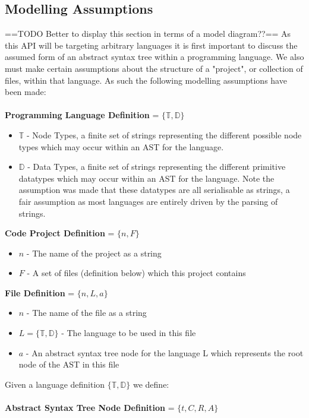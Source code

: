 \documentclass{article}
\begin{document}
\subsection{Modelling Assumptions}
==TODO Better to display this section in terms of a model diagram??==
As this API will be targeting arbitrary languages it is first important to discuss the assumed form of an abstract syntax tree within a programming language. We also must make certain assumptions about the structure of a "project", or collection of files, within that language. As such the following modelling assumptions have been made:
\\
\\
\textbf{Programming Language Definition} = $\{\mathbb{T},\mathbb{D}\}$ 
\begin{itemize}
\item $\mathbb{T}$ - Node Types, a finite set of strings representing the different possible node types which may occur within an AST for the language.
\item $\mathbb{D}$ - Data Types, a finite set of strings representing the different primitive datatypes which may occur within an AST for the language. Note the assumption was made that these datatypes are all serialisable as strings, a fair assumption as most languages are entirely driven by the parsing of strings.
\end{itemize}
%
\textbf{Code Project Definition} = $\{n,F \}$ 
\begin{itemize}
\item $n$ - The name of the project as a string
\item $F$ - A set of files (definition below) which this project contains
\end{itemize}
%
\textbf{File Definition} = $\{n, L, a\}$ 
\begin{itemize}
\item $n$ - The name of the file as a string
\item $L=\{\mathbb{T},\mathbb{D}\}$ - The language to be used in this file
\item $a$ - An abstract syntax tree node for the language L which represents the root node of the AST in this file
\end{itemize}
%
Given a language definition $\{\mathbb{T},\mathbb{D}\}$ we define:\\
\\
\textbf{Abstract Syntax Tree Node Definition} = $\{t,C,R,A\}$ 
\end{document}
